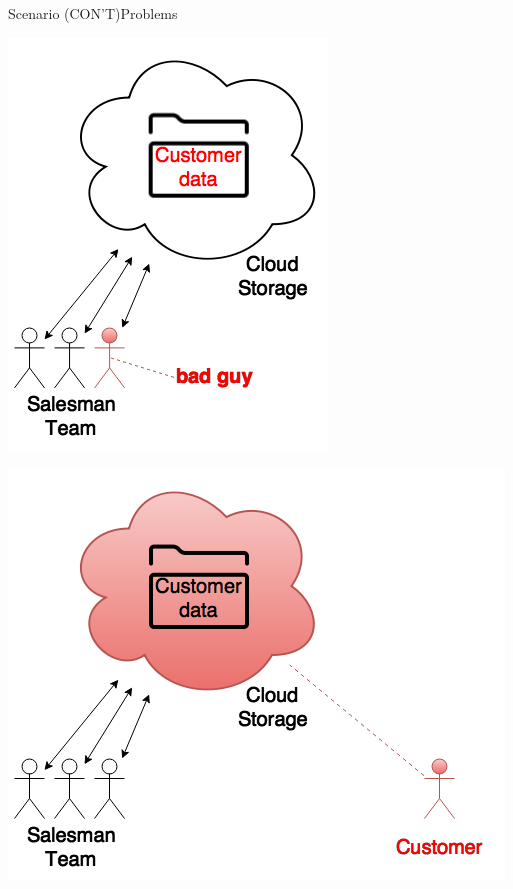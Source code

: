 \documentclass{beamer}
\begin{document}
\begin{CJK}{UTF8}{bkai}
\begin{frame}{Scenario (CON'T)}{Problems}
	\begin{minipage}{.49\hsize}
	\begin{center}
	\includegraphics[width=.75\textwidth]{Scenario2.png}
	\end{center}
	\end{minipage}
	\pause
	\begin{minipage}{.49\hsize}
	\begin{center}
	\includegraphics[width=.95\textwidth]{Scenario3.png}
	\end{center}
	\end{minipage}
\end{frame}


\end{CJK}
\end{document}
